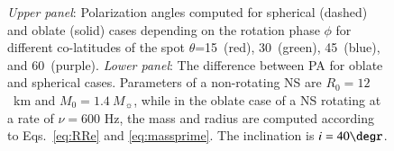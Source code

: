 \documentclass{aa}
\newcommand{\req}{R_{\mathrm{e}}}
\newcommand{\msun}{{M}_{\sun}}
\begin{document}



\begin{figure}
\caption{\textit{Upper panel}: Polarization angles computed for spherical (dashed) and oblate (solid) cases depending on the rotation phase $\phi$ for different co-latitudes of the spot  $\theta$=15\degr\ (red), 30\degr\ (green), 45\degr\ (blue), and 60\degr\ (purple). 
\textit{Lower panel}: The difference between PA for oblate and spherical cases. 
Parameters of a non-rotating NS are $R_0 = 12$~km and $M_0 = 1.4~\msun$, while in the oblate case of a NS rotating at a rate of $\nu = 600$ Hz, the mass and radius are computed according to Eqs.~\eqref{eq:RRe} and \eqref{eq:massprime}. 
The inclination is $i = 40\degr$.
}
\label{fig:diff_theta}
\end{figure}
\end{document}
